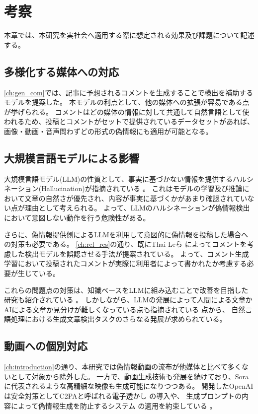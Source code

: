 \chapter{考察}
\label{ch:discussion}
本章では、本研究を実社会へ適用する際に想定される効果及び課題について記述する。

\section{多様化する媒体への対応}
\cref{ch:gen_com}では、記事に予想されるコメントを生成することで検出を補助するモデルを提案した。
本モデルの利点として、他の媒体への拡張が容易である点が挙げられる。
コメントはどの媒体の情報に対して共通して自然言語として使われるため、投稿とコメントがセットで提供されているデータセットがあれば、画像・動画・音声問わずどの形式の偽情報にも適用が可能となる。

\section{大規模言語モデルによる影響}
大規模言語モデル(LLM)の性質として、事実に基づかない情報を提供するハルシネーション(Hallucination)が指摘されている \cite{Alkaissi2023-bo}。
これはモデルの学習及び推論において文章の自然さが優先され、内容が事実に基づくかがあまり確認されていない点が理由として考えられる。
よって、LLMのハルシネーションが偽情報検出において意図しない動作を行う危険性がある。

さらに、偽情報提供側によるLLMを利用して意図的に偽情報を投稿した場合への対策も必要である。
\cref{ch:rel_res}の通り、既にThai Leら \cite{9338282}によってコメントを考慮した検出モデルを誤認させる手法が提案されている。
よって、コメント生成学習において投稿されたコメントが実際に利用者によって書かれたか考慮する必要が生じている。

これらの問題点の対策は、知識ベースをLLMに組み込むことで改善を目指した研究も紹介されている \cite{10.1145/3512467}。
しかしながら、LLMの発展によって人間による文章かAIによる文章か見分けが難しくなっている点も指摘されている \cite{Elkhatat2023,chen2023can}点から、
自然言語処理における生成文章検出タスクのさらなる発展が求められている。

\section{動画への個別対応}
\cref{ch:introduction}の通り、本研究では偽情報動画の流布が他媒体と比べて多くないとして対象から除外した。
一方で、動画生成技術も発展を続けており、Sora \cite{videoworldsimulators2024}に代表されるような高精細な映像も生成可能になりつつある。
開発したOpenAIは安全対策としてC2PAと呼ばれる電子透かし \cite{C2PA}の導入や、
生成プロンプトの内容によって偽情報生成を防止するシステム \cite{AI_2023}の適用を約束している \cite{AI_2024}。

